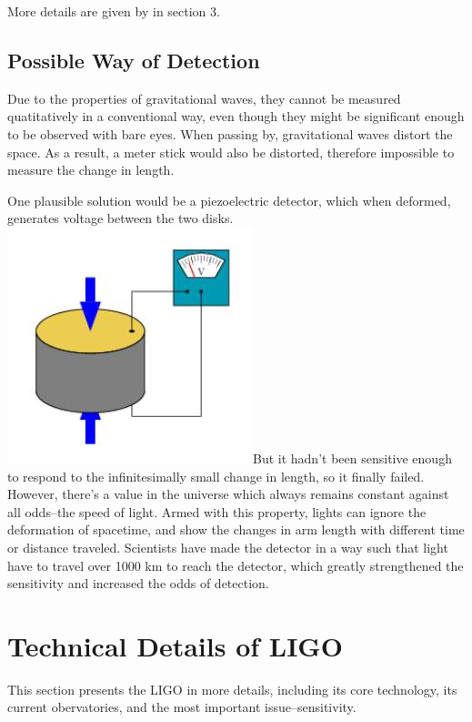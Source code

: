 \documentclass[aps,prl,preprint]{revtex4}
\begin{document}
More details are given by \cite{SBackground} in section 3.

\subsection{Possible Way of Detection}
Due to the properties of gravitational waves, they cannot be measured quatitatively in a conventional way, even though they might be significant enough to be observed with bare eyes. When passing by, gravitational waves distort the space. As a result, a meter stick would also be distorted, therefore impossible to measure the change in length.

One plausible solution would be a piezoelectric detector, which when deformed, generates voltage between the two disks. \newline\includegraphics{Piezoelectric}\newline But it hadn't been sensitive enough to respond to the infinitesimally small change in length, so it finally failed. However, there's a value in the universe which always remains constant against all odds--the speed of light. Armed with this property, lights can ignore the deformation of spacetime, and show the changes in arm length with different time or distance traveled. Scientists have made the detector in a way such that light have to travel over 1000 km \cite{Interferometer} to reach the detector, which greatly strengthened the sensitivity and increased the odds of detection.


\section{Technical Details of LIGO \label{TechLIGO}}
This section presents the LIGO in more details, including its core technology, its current obervatories, and the most important issue--sensitivity.
\end{document}
